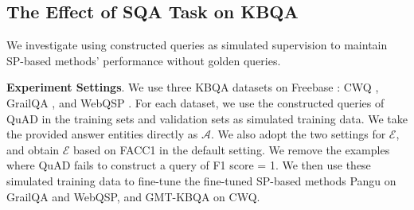 \documentclass[runningheads]{llncs}
\begin{document}
\subsection{The Effect of SQA Task on KBQA}\label{subsec:kbqa_performance}

We investigate using constructed queries as simulated supervision to maintain SP-based methods' performance without golden queries.


\noindent \textbf{Experiment Settings}. 
We use three KBQA datasets on Freebase \cite{bollacker2008freebase}: CWQ \cite{talmor2018web}, GrailQA \cite{gu2021beyond}, and WebQSP \cite{yih2016value}. 
For each dataset, we use the constructed queries of QuAD in the training sets and validation sets as simulated training data.
We take the provided answer entities directly as $\mathcal{A}$.
We also adopt the two settings for $\mathcal{E}$, and obtain $\mathcal{E}$ based on FACC1 \cite{facc1} in the default setting.
We remove the examples where QuAD fails to construct a query of F1 score = 1.  
We then use these simulated training data to fine-tune the fine-tuned SP-based methods Pangu \cite{gu2023pangu} on GrailQA and WebQSP, and GMT-KBQA \cite{hu2022gmt} on CWQ.
\end{document}
